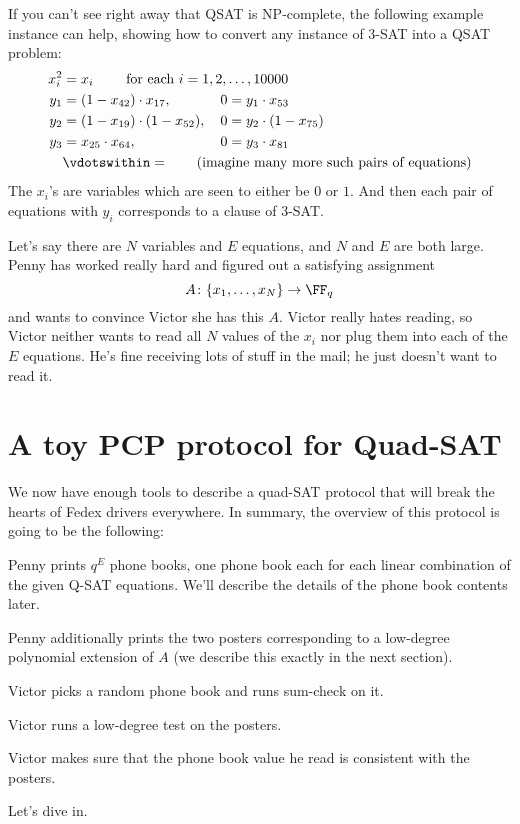 \documentclass[11pt]{scrreprt}
\begin{document}
\begin{remark*}
  If you can't see right away that QSAT is NP-complete,
  the following example instance can help,
  showing how to convert any instance of 3-SAT into a QSAT problem:
  \begin{align*}
    x_i^2 &= x_i \qquad \text{ for each } i=1,2,\dots,10000 \\
    y_1 &= (1-x_{42}) \cdot x_{17}, \hspace{3.5em} 0 = y_1 \cdot x_{53} \\
    y_2 &= (1-x_{19}) \cdot (1-x_{52}), \hspace{1em} 0 = y_2 \cdot (1-x_{75}) \\
    y_3 &= x_{25} \cdot x_{64}, \hspace{6em} 0 = y_3 \cdot x_{81} \\
    &\vdotswithin= \qquad\text{(imagine many more such pairs of equations)}
  \end{align*}
  The $x_i$'s are variables which are seen to either be $0$ or $1$.
  And then each pair of equations with $y_i$ corresponds to a clause of 3-SAT.
\end{remark*}

Let's say there are $N$ variables and $E$ equations, and $N$ and $E$ are both large.
Penny has worked really hard and figured out a satisfying assignment
\[ A \colon \{x_1, \dots, x_N\} \to \FF_q \]
and wants to convince Victor she has this $A$.
Victor really hates reading,
so Victor neither wants to read all $N$ values of the $x_i$
nor plug them into each of the $E$ equations.
He's fine receiving lots of stuff in the mail; he just doesn't want to read it.

\section{A toy PCP protocol for Quad-SAT}
We now have enough tools to describe a quad-SAT protocol that will break
the hearts of Fedex drivers everywhere.
In summary, the overview of this protocol is going to be the following:
\begin{itemize}
  \ii Penny prints $q^E$ phone books, one phone book each for each linear combination
  of the given Q-SAT equations.
  We'll describe the details of the phone book contents later.

  \ii Penny additionally prints the two posters corresponding
  to a low-degree polynomial extension of $A$
  (we describe this exactly in the next section).

  \ii Victor picks a random phone book and runs sum-check on it.

  \ii Victor runs a low-degree test on the posters.

  \ii Victor makes sure that the phone book value he read is consistent with the posters.
\end{itemize}
Let's dive in.
\end{document}

